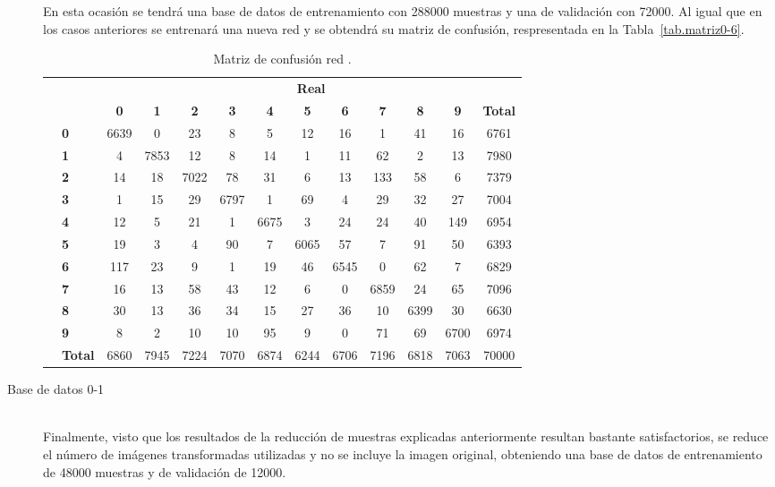 \begin{description}
	En esta ocasión se tendrá una base de datos de entrenamiento con 288000 muestras y una de validación con 72000. Al igual que en los casos anteriores se entrenará una nueva red y se obtendrá su matriz de confusión, respresentada en la Tabla~\ref{tab.matriz0-6}.
	\begin{table}[H]
		\centering
		\begin{tabular}{|c|l|c|c|c|c|c|c|c|c|c|c|c|}
			\cline{3-13} 
			\multicolumn{2}{c|}{} & \multicolumn{11}{c|}{\textbf{Real}} \\ \cline{3-13} 
			\multicolumn{2}{c|}{} & \textbf{0} & \textbf{1} & \textbf{2} &  \textbf{3} & \textbf{4} & \textbf{5} & \textbf{6} & \textbf{7} & \textbf{8} & \textbf{9} & \textbf{Total}\\ \hline
			\multirow{10}{0.5cm}{\rotatebox{90}{\textbf{Predicción}}}& \textbf{0} & \cellcolor{lightgray}6639 & 0 & 23 & 8 & 5 & 12 & 16 & 1 & 41 & 16 & 6761\\ \cline{2-13}
			& \textbf{1} & 4 & \cellcolor{lightgray}7853 & 12 & 8 & 14 & 1 & 11 & 62 & 2 & 13 & 7980\\ \cline{2-13}
			& \textbf{2} & 14 & 18 & \cellcolor{lightgray}7022 & 78 & 31 & 6 & 13 & 133 & 58 & 6 & 7379\\ \cline{2-13}
			& \textbf{3} & 1 & 15 & 29 & \cellcolor{lightgray}6797 & 1 & 69 & 4 & 29 & 32 & 27 & 7004\\ \cline{2-13}
			& \textbf{4} & 12 & 5 & 21 & 1 & \cellcolor{lightgray}6675 & 3 & 24 & 24 & 40 & 149 & 6954\\ \cline{2-13}
			& \textbf{5} & 19 & 3 & 4 & 90 & 7 & \cellcolor{lightgray}6065 & 57 & 7 & 91 & 50 & 6393\\ \cline{2-13}
			& \textbf{6} & 117 & 23 & 9 & 1 & 19 & 46 & \cellcolor{lightgray}6545 & 0 & 62 & 7 & 6829\\ \cline{2-13}
			& \textbf{7} & 16 & 13 & 58 & 43 & 12 & 6 & 0 & \cellcolor{lightgray}6859 & 24 & 65 & 7096\\ \cline{2-13}
			& \textbf{8} & 30 & 13 & 36 & 34 & 15 & 27 & 36 & 10 & \cellcolor{lightgray}6399 & 30 & 6630\\ \cline{2-13}
			& \textbf{9} & 8 & 2 & 10 & 10 & 95 & 9 & 0 & 71 & 69 & \cellcolor{lightgray}6700 & 6974\\ \cline{2-13}
			& \textbf{Total} & 6860 & 7945 & 7224 & 7070 & 6874 & 6244 & 6706 & 7196 & 6818 & 7063 & 70000\\ \hline
		\end{tabular}
		\caption{Matriz de confusión red .}
		\label{tab.matriz}
	\end{table}
	\item[Base de datos 0-1] \hfill 
	\vspace{10pt}
	\\
	Finalmente, visto que los resultados de la reducción de muestras explicadas anteriormente resultan bastante satisfactorios, se reduce el número de imágenes transformadas utilizadas y no se incluye la imagen original, obteniendo una base de datos de entrenamiento de 48000 muestras y de validación de 12000.\\
	

\end{description}

